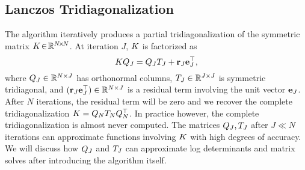 

\subsection{Lanczos Tridiagonalization}
\label{sec:lanczos}

The \citet{lanczos1950iteration} algorithm iteratively produces a partial tridiagonalization of the symmetric matrix $K \! \in \! \mathbb{R}^{N \! \times \! N}$.
At iteration $J$, $K$ is factorized as
%
\begin{equation}
  K Q_J = Q_J T_J + \mathbf{r}_J \mathbf{e}_{J}^\top,
  \label{eqn:lanczos}
\end{equation}
%
where $Q_J \in \mathbb{R}^{N \times J}$ has orthonormal columns, $T_J \in \mathbb{R}^{J \times J}$ is symmetric tridiagonal, and $(\mathbf{r}_J \mathbf{e}_{J}^\top) \in \mathbb{R}^{N \times J}$ is a residual term involving the unit vector $\mathbf{e}_{J}$.
After $N$ iterations, the residual term will be zero and we recover the complete tridiagonalization $K = Q_N T_N Q^\top_N$.
In practice however, the complete tridiagonalization is almost never computed.
The matrices $Q_J, T_J$ after $J \ll N$ iterations can approximate functions involving $K$ with high degrees of accuracy.
We will discuss how $Q_J$ and $T_J$ can approximate log determinants and matrix solves after introducing the algorithm itself.

